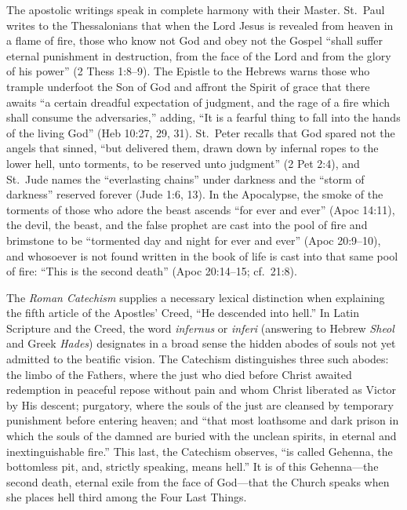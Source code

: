 The apostolic writings speak in complete harmony with their Master. St.\ Paul writes to the Thessalonians that when the Lord Jesus is revealed from heaven in a flame of fire, those who know not God and obey not the Gospel ``shall suffer eternal punishment in destruction, from the face of the Lord and from the glory of his power'' (2 Thess 1:8--9). The Epistle to the Hebrews warns those who trample underfoot the Son of God and affront the Spirit of grace that there awaits ``a certain dreadful expectation of judgment, and the rage of a fire which shall consume the adversaries,'' adding, ``It is a fearful thing to fall into the hands of the living God'' (Heb 10:27, 29, 31). St.\ Peter recalls that God spared not the angels that sinned, ``but delivered them, drawn down by infernal ropes to the lower hell, unto torments, to be reserved unto judgment'' (2 Pet 2:4), and St.\ Jude names the ``everlasting chains'' under darkness and the ``storm of darkness'' reserved forever (Jude 1:6, 13). In the Apocalypse, the smoke of the torments of those who adore the beast ascends ``for ever and ever'' (Apoc 14:11), the devil, the beast, and the false prophet are cast into the pool of fire and brimstone to be ``tormented day and night for ever and ever'' (Apoc 20:9--10), and whosoever is not found written in the book of life is cast into that same pool of fire: ``This is the second death'' (Apoc 20:14--15; cf.\ 21:8).

The \textit{Roman Catechism} supplies a necessary lexical distinction when explaining the fifth article of the Apostles' Creed, ``He descended into hell.'' In Latin Scripture and the Creed, the word \textit{infernus} or \textit{inferi} (answering to Hebrew \textit{Sheol} and Greek \textit{Hades}) designates in a broad sense the hidden abodes of souls not yet admitted to the beatific vision. The Catechism distinguishes three such abodes: the limbo of the Fathers, where the just who died before Christ awaited redemption in peaceful repose without pain and whom Christ liberated as Victor by His descent; purgatory, where the souls of the just are cleansed by temporary punishment before entering heaven; and ``that most loathsome and dark prison in which the souls of the damned are buried with the unclean spirits, in eternal and inextinguishable fire.'' This last, the Catechism observes, ``is called Gehenna, the bottomless pit, and, strictly speaking, means hell.'' It is of this Gehenna---the second death, eternal exile from the face of God---that the Church speaks when she places hell third among the Four Last Things.
